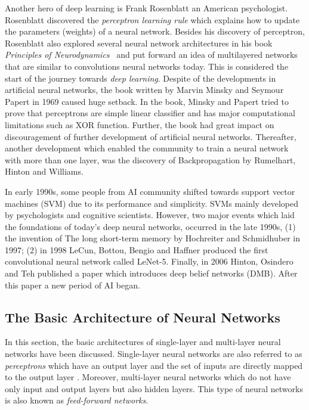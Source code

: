 Another hero of deep learning is Frank Rosenblatt an American psychologist. Rosenblatt discovered the \textit{perceptron learning rule} which explains how to update the parameters (weights) of a neural network. Besides his discovery of perceptron,  Rosenblatt also explored several neural network architectures in his book \textit{Principles of Neurodynamics}~\cite{} and
put forward an idea of multilayered networks that are similar to convolutions neural networks today. This is considered the start of the journey towards \textit{deep learning}. Despite of the developments in artificial neural networks,  the book written by Marvin Minsky and Seymour Papert in 1969 caused huge setback. In the book, Minsky and Papert tried to prove that perceptrons are simple linear classifier and has major computational limitations such as XOR function. Further, the book had great impact on discouragement of further development of artificial neural networks. Thereafter, another development which enabled the community to train a neural network with more than one layer, was the discovery of Backpropagation by Rumelhart, Hinton and Williams. 

In early 1990s, some people from AI community shifted towards support vector machines (SVM) due to its performance and simplicity. SVMs mainly developed by psychologists and cognitive scientists. However, two major events which laid the foundations of today's deep neural networks, occurred in the late 1990s, (1) the invention of The long short-term memory by Hochreiter and Schmidhuber in 1997; (2) in 1998 LeCun, Bottou, Bengio and Haffner produced the first convolutional neural network called LeNet-5. Finally, in 2006 Hinton, Osindero and Teh published a paper which introduces deep belief networks (DMB). After this paper a new period of AI began.
\subsection{The Basic Architecture of Neural Networks} 
In this section, the basic architectures of single-layer and multi-layer neural networks have been discussed. Single-layer neural networks are also referred to as \textit{perceptrons} which have an output layer and the set of inputs are directly mapped to the output layer%
. Moreover, multi-layer neural networks which do not have only input and output layers but also hidden layers. This type of neural networks is also known as \textit{feed-forward networks}. 
